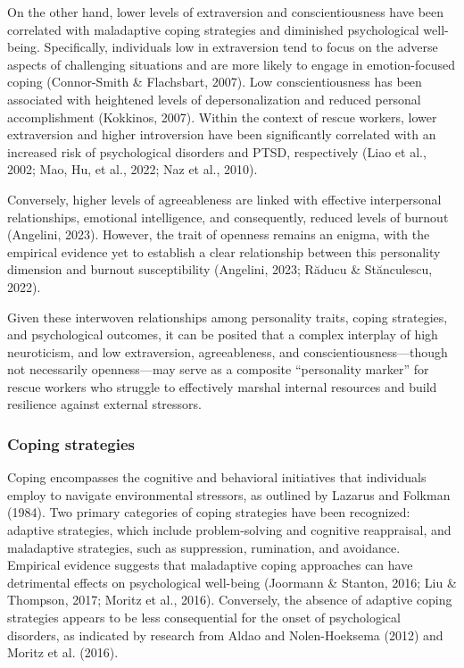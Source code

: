 \documentclass[
  man]{apa7}
\begin{document}
On the other hand, lower levels of extraversion and conscientiousness have been correlated with maladaptive coping strategies and diminished psychological well-being. Specifically, individuals low in extraversion tend to focus on the adverse aspects of challenging situations and are more likely to engage in emotion-focused coping (Connor-Smith \& Flachsbart, 2007). Low conscientiousness has been associated with heightened levels of depersonalization and reduced personal accomplishment (Kokkinos, 2007). Within the context of rescue workers, lower extraversion and higher introversion have been significantly correlated with an increased risk of psychological disorders and PTSD, respectively (Liao et al., 2002; Mao, Hu, et al., 2022; Naz et al., 2010).

Conversely, higher levels of agreeableness are linked with effective interpersonal relationships, emotional intelligence, and consequently, reduced levels of burnout (Angelini, 2023). However, the trait of openness remains an enigma, with the empirical evidence yet to establish a clear relationship between this personality dimension and burnout susceptibility (Angelini, 2023; Răducu \& Stănculescu, 2022).

Given these interwoven relationships among personality traits, coping strategies, and psychological outcomes, it can be posited that a complex interplay of high neuroticism, and low extraversion, agreeableness, and conscientiousness---though not necessarily openness---may serve as a composite ``personality marker'' for rescue workers who struggle to effectively marshal internal resources and build resilience against external stressors.

\hypertarget{coping-strategies}{%
\subsubsection{Coping strategies}\label{coping-strategies}}

Coping encompasses the cognitive and behavioral initiatives that individuals employ to navigate environmental stressors, as outlined by Lazarus and Folkman (1984). Two primary categories of coping strategies have been recognized: adaptive strategies, which include problem-solving and cognitive reappraisal, and maladaptive strategies, such as suppression, rumination, and avoidance. Empirical evidence suggests that maladaptive coping approaches can have detrimental effects on psychological well-being (Joormann \& Stanton, 2016; Liu \& Thompson, 2017; Moritz et al., 2016). Conversely, the absence of adaptive coping strategies appears to be less consequential for the onset of psychological disorders, as indicated by research from Aldao and Nolen-Hoeksema (2012) and Moritz et al. (2016).
\end{document}
